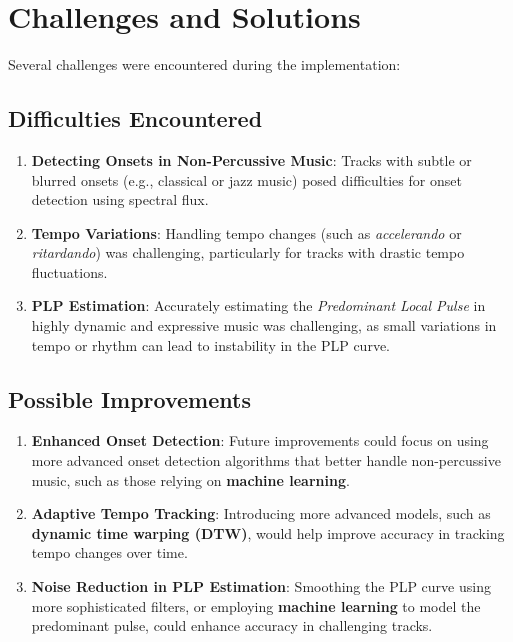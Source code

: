 \documentclass[
paper=A4,               %
pagesize=auto,          %
fontsize=12pt,          %
DIV=16,                 %
twoside=false,           %
BCOR=20mm,              %
parskip=false,          %
chapterprefix=true,     %
appendixprefix=true,    %
listof=totoc,           %
bibliography=totoc,     %
headinclude=true,       %
footinclude=false,      %
headsepline=false,       %
footsepline=false,      %
headings=small,         %
numbers=noenddot        %
] {scrbook}
\begin{document}
\section*{Challenges and Solutions}

Several challenges were encountered during the implementation:

\subsection*{Difficulties Encountered}
\begin{enumerate}
    \item \textbf{Detecting Onsets in Non-Percussive Music}: Tracks with subtle or blurred onsets (e.g., classical or jazz music) posed difficulties for onset detection using spectral flux.
    \item \textbf{Tempo Variations}: Handling tempo changes (such as \textit{accelerando} or \textit{ritardando}) was challenging, particularly for tracks with drastic tempo fluctuations.
    \item \textbf{PLP Estimation}: Accurately estimating the \textit{Predominant Local Pulse} in highly dynamic and expressive music was challenging, as small variations in tempo or rhythm can lead to instability in the PLP curve.
\end{enumerate}

\subsection*{Possible Improvements}
\begin{enumerate}
    \item \textbf{Enhanced Onset Detection}: Future improvements could focus on using more advanced onset detection algorithms that better handle non-percussive music, such as those relying on \textbf{machine learning}.
    \item \textbf{Adaptive Tempo Tracking}: Introducing more advanced models, such as \textbf{dynamic time warping (DTW)}, would help improve accuracy in tracking tempo changes over time.
    \item \textbf{Noise Reduction in PLP Estimation}: Smoothing the PLP curve using more sophisticated filters, or employing \textbf{machine learning} to model the predominant pulse, could enhance accuracy in challenging tracks.
\end{enumerate}
   


\end{document}
